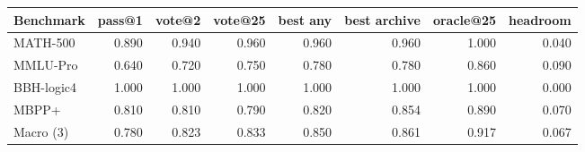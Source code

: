 \begin{tabular}{lrrrrrrr}
\toprule
Benchmark & pass@1 & vote@2 & vote@25 & best any & best archive & oracle@25 & headroom \\
\midrule
MATH-500 & 0.890 & 0.940 & 0.960 & 0.960 & 0.960 & 1.000 & 0.040 \\
MMLU-Pro & 0.640 & 0.720 & 0.750 & 0.780 & 0.780 & 0.860 & 0.090 \\
BBH-logic4 & 1.000 & 1.000 & 1.000 & 1.000 & 1.000 & 1.000 & 0.000 \\
MBPP+ & 0.810 & 0.810 & 0.790 & 0.820 & 0.854 & 0.890 & 0.070 \\
Macro (3) & 0.780 & 0.823 & 0.833 & 0.850 & 0.861 & 0.917 & 0.067 \\
\bottomrule
\end{tabular}
